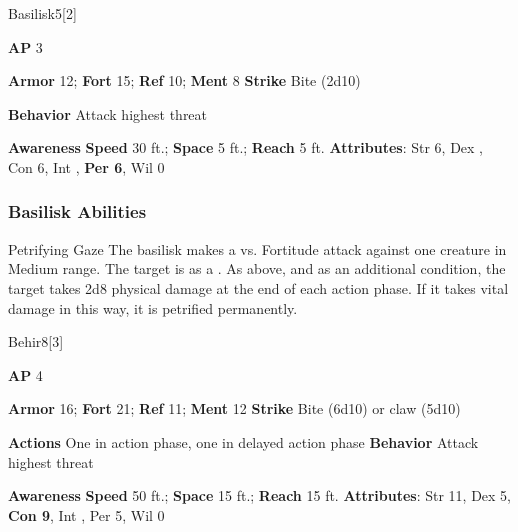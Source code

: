\begin{monsection}{Basilisk}{5}[2]
\vspace{-1em}\vspace{-1em}
\begin{spellcontent}
\begin{spelltargetinginfo}
{\textbf{AP} 3}

\pari \textbf{Armor} 12;
\textbf{Fort} 15;
\textbf{Ref} 10;
\textbf{Ment} 8
\pari \textbf{Strike} Bite  (2d10)



\pari \textbf{Behavior} Attack highest threat
\end{spelltargetinginfo}
\end{spellcontent}

\begin{monsterfooter}
\pari \textbf{Awareness} 
\pari \textbf{Speed} 30 ft.;
\textbf{Space} 5 ft.;
\textbf{Reach} 5 ft.
\pari \textbf{Attributes}:
Str 6,
Dex ,
Con 6,
Int ,
\textbf{Per 6},
Wil 0
\end{monsterfooter}
\end{monsection}


\subsubsection{Basilisk Abilities}

\begin{freeability}{Petrifying Gaze}
The basilisk makes a  vs. Fortitude attack against one creature in Medium range.
\hit The target is  as a .
\crit As above, and as an additional condition, the target takes 2d8 physical damage at the end of each action phase.
If it takes vital damage in this way, it is petrified permanently.
\end{freeability}

\begin{monsection}{Behir}{8}[3]
\vspace{-1em}\vspace{-1em}
\begin{spellcontent}
\begin{spelltargetinginfo}
{\textbf{AP} 4}

\pari \textbf{Armor} 16;
\textbf{Fort} 21;
\textbf{Ref} 11;
\textbf{Ment} 12
\pari \textbf{Strike} Bite  (6d10) or claw  (5d10)


\pari \textbf{Actions} One in action phase, one in delayed action phase
\pari \textbf{Behavior} Attack highest threat
\end{spelltargetinginfo}
\end{spellcontent}

\begin{monsterfooter}
\pari \textbf{Awareness} 
\pari \textbf{Speed} 50 ft.;
\textbf{Space} 15 ft.;
\textbf{Reach} 15 ft.
\pari \textbf{Attributes}:
Str 11,
Dex 5,
\textbf{Con 9},
Int ,
Per 5,
Wil 0
\end{monsterfooter}
\end{monsection}


